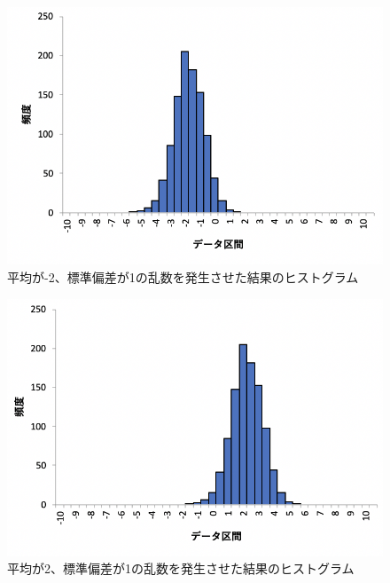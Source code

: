 \documentclass[12pt]{jarticle}
\begin{document}
\clearpage
\begin{figure}[h]
    \begin{center}
        \includegraphics[scale=0.7]{kadai4_3graph2.png}
    \end{center}
    \caption{平均が-2、標準偏差が1の乱数を発生させた結果のヒストグラム}
\end{figure}
\begin{figure}[h]
    \begin{center}
        \includegraphics[scale=0.7]{kadai4_3graph3.png}
    \end{center}
    \caption{平均が2、標準偏差が1の乱数を発生させた結果のヒストグラム}
\end{figure}
\clearpage
\end{document}
